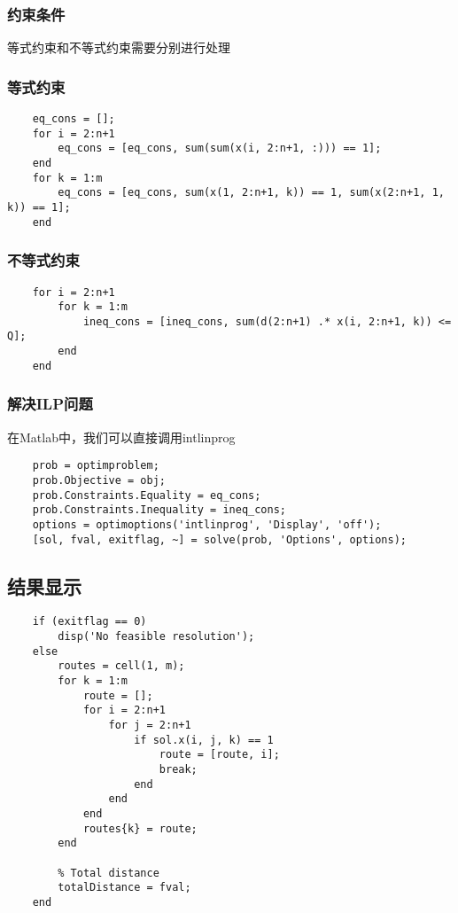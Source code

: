 \subsubsection{约束条件}
    等式约束和不等式约束需要分别进行处理
    \subsubsection{等式约束}
    \begin{lstlisting}
    eq_cons = [];
    for i = 2:n+1
        eq_cons = [eq_cons, sum(sum(x(i, 2:n+1, :))) == 1];
    end
    for k = 1:m
        eq_cons = [eq_cons, sum(x(1, 2:n+1, k)) == 1, sum(x(2:n+1, 1, k)) == 1];
    end
    \end{lstlisting}
    \subsubsection{不等式约束}
    \begin{lstlisting}
    for i = 2:n+1
        for k = 1:m
            ineq_cons = [ineq_cons, sum(d(2:n+1) .* x(i, 2:n+1, k)) <= Q];
        end
    end
    \end{lstlisting}
\subsubsection{解决ILP问题}
    在Matlab中，我们可以直接调用intlinprog
    \begin{lstlisting}
    prob = optimproblem;
    prob.Objective = obj;
    prob.Constraints.Equality = eq_cons;
    prob.Constraints.Inequality = ineq_cons;
    options = optimoptions('intlinprog', 'Display', 'off');
    [sol, fval, exitflag, ~] = solve(prob, 'Options', options);
    \end{lstlisting}
\subsection{结果显示}
    \begin{lstlisting}
    if (exitflag == 0)
        disp('No feasible resolution');
    else
        routes = cell(1, m);
        for k = 1:m
            route = [];
            for i = 2:n+1
                for j = 2:n+1
                    if sol.x(i, j, k) == 1
                        route = [route, i];
                        break;
                    end
                end
            end
            routes{k} = route;
        end
        
        % Total distance
        totalDistance = fval;
    end
    \end{lstlisting}

